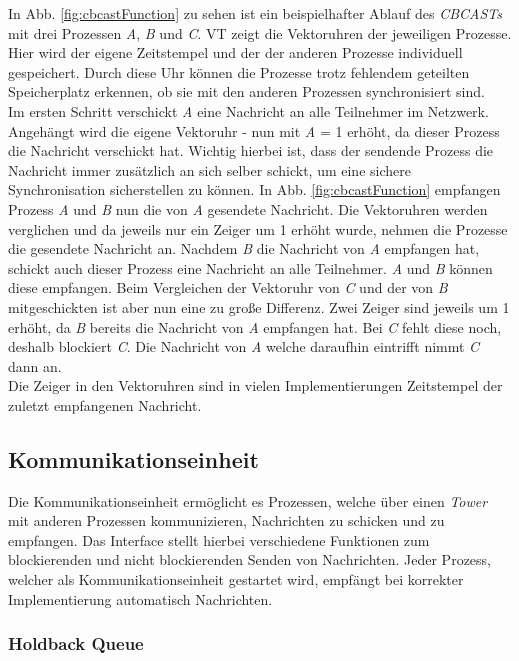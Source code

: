 In Abb. \ref{fig:cbcastFunction} zu sehen ist ein beispielhafter Ablauf des \textit{CBCASTs} mit drei Prozessen \textit{A}, \textit{B} und \textit{C}. VT zeigt die Vektoruhren der jeweiligen Prozesse. Hier wird der eigene Zeitstempel und der der anderen Prozesse individuell gespeichert. Durch diese Uhr können die Prozesse trotz fehlendem geteilten Speicherplatz erkennen, ob sie mit den anderen Prozessen synchronisiert sind.\\
Im ersten Schritt verschickt \textit{A} eine Nachricht an alle Teilnehmer im Netzwerk. Angehängt wird die eigene Vektoruhr - nun mit \textit{A} = 1 erhöht, da dieser Prozess die Nachricht verschickt hat. Wichtig hierbei ist, dass der sendende Prozess die Nachricht immer zusätzlich an sich selber schickt, um eine sichere Synchronisation sicherstellen zu können. In Abb. \ref{fig:cbcastFunction} empfangen Prozess \textit{A} und \textit{B} nun die von \textit{A} gesendete Nachricht. Die Vektoruhren werden verglichen und da jeweils nur ein Zeiger um 1 erhöht wurde, nehmen die Prozesse die gesendete Nachricht an. Nachdem \textit{B} die Nachricht von \textit{A} empfangen hat, schickt auch dieser Prozess eine Nachricht an alle Teilnehmer. \textit{A} und \textit{B} können diese empfangen. Beim Vergleichen der Vektoruhr von \textit{C} und der von \textit{B} mitgeschickten ist aber nun eine zu große Differenz. Zwei Zeiger sind jeweils um 1 erhöht, da \textit{B} bereits die Nachricht von \textit{A} empfangen hat. Bei \textit{C} fehlt diese noch, deshalb blockiert \textit{C}. Die Nachricht von \textit{A} welche daraufhin eintrifft nimmt \textit{C} dann an.\\
Die Zeiger in den Vektoruhren sind in vielen Implementierungen Zeitstempel der zuletzt empfangenen Nachricht.

\subsection{Kommunikationseinheit}

Die Kommunikationseinheit ermöglicht es Prozessen, welche über einen \textit{Tower} mit anderen Prozessen kommunizieren, Nachrichten zu schicken und zu empfangen. Das Interface stellt hierbei verschiedene Funktionen zum blockierenden und nicht blockierenden Senden von Nachrichten. Jeder Prozess, welcher als Kommunikationseinheit gestartet wird, empfängt bei korrekter Implementierung automatisch Nachrichten.

\subsubsection{Holdback Queue}

